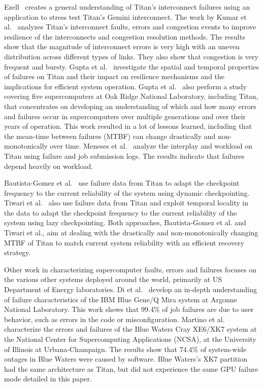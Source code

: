 Ezell~\cite{osti_1086655} creates a general understanding of Titan's interconnect failures using an application to stress test Titan's Gemini interconnect.
%
The work by Kumar et al.~\cite{kumar18understanding} analyzes Titan's interconnect faults, errors and congestion events to improve resilience of the interconnects and congestion resolution methods. The results show that the magnitude of interconnect errors is very high with an uneven distribution across different types of links. They also show that congestion is very frequent and bursty.
%
Gupta et al.~\cite{7266836} investigate the spatial and temporal properties of failures on Titan and their impact on resilience mechanisms and the implications for efficient system operation.
%
Gupta et al.~\cite{gupta17failures} also perform a study covering five supercomputers at Oak Ridge National Laboratory, including Titan, that concentrates on developing an understanding of which and how many errors and failures occur in supercomputers over multiple generations and over their years of operation. This work resulted in a lot of lessons learned, including that the mean-time between failures (MTBF) can change drastically and non-monotonically over time.
%
Meneses et al.~\cite{Meneses15Analyzing} analyze the interplay and workload on Titan using failure and job submission logs. The results indicate that failures depend heavily on workload.

Bautista-Gomez et al.~\cite{bautista-gomez16reducing} use failure data from Titan to adapt the checkpoint frequency to the current reliability of the system using dynamic checkpointing.
%
Tiwari et al.~\cite{6903564} also use failure data from Titan and exploit temporal locality in the data to adapt the checkpoint frequency to the current reliability of the system using lazy checkpointing.
%
Both approaches, Bautista-Gomez et al. and Tiwari et al., aim at dealing with the drastically and non-monotonically changing MTBF of Titan to match current system reliability with an efficient recovery strategy.

Other work in characterizing supercomputer faults, errors and failures focuses on the various other systems deployed around the world, primarily at US Department of Energy laboratories.
%
Di et al.~\cite{8809553} develop an in-depth understanding of failure characteristics of the IBM Blue Gene/Q Mira system at Argonne National Laboratory. This work shows that 99.4\% of job failures are due to user behavior, such as errors in the code or misconfiguration. Martino et al.~\cite{6903615} characterize the errors and failures of the Blue Waters Cray XE6/XK7 system at the National Center for Supercomputing Applications (NCSA), at the University of Illinois at Urbana-Champaign. The results show that 74.4\% of system-wide outages in Blue Waters were caused by software. Blue Waters's XK7 partition had the same architecture as Titan, but did not experience the same GPU failure mode detailed in this paper.
